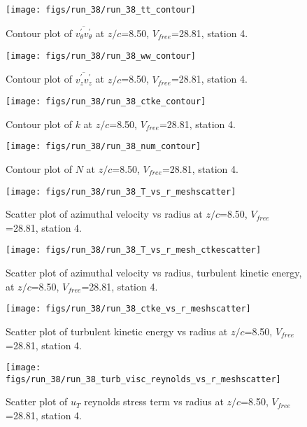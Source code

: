\begin{figure}[H]
\centering
\texttt{[image: figs/run\_38/run\_38\_tt\_contour]}
\caption{Contour plot of $\overline{v_{\theta}^{\prime} v_{\theta}^{\prime}}$ at $z/c$=8.50, $V_{free}$=28.81, station 4.}
\end{figure}


\begin{figure}[H]
\centering
\texttt{[image: figs/run\_38/run\_38\_ww\_contour]}
\caption{Contour plot of $\overline{v_{z}^{\prime} v_{z}^{\prime}}$ at $z/c$=8.50, $V_{free}$=28.81, station 4.}
\end{figure}


\begin{figure}[H]
\centering
\texttt{[image: figs/run\_38/run\_38\_ctke\_contour]}
\caption{Contour plot of $k$ at $z/c$=8.50, $V_{free}$=28.81, station 4.}
\end{figure}


\begin{figure}[H]
\centering
\texttt{[image: figs/run\_38/run\_38\_num\_contour]}
\caption{Contour plot of $N$ at $z/c$=8.50, $V_{free}$=28.81, station 4.}
\end{figure}


\begin{figure}[H]
\centering
\texttt{[image: figs/run\_38/run\_38\_T\_vs\_r\_meshscatter]}
\caption{Scatter plot of azimuthal velocity vs radius at $z/c$=8.50, $V_{free}$=28.81, station 4.}
\end{figure}


\begin{figure}[H]
\centering
\texttt{[image: figs/run\_38/run\_38\_T\_vs\_r\_mesh\_ctkescatter]}
\caption{Scatter plot of azimuthal velocity vs radius, turbulent kinetic energy, at $z/c$=8.50, $V_{free}$=28.81, station 4.}
\end{figure}


\begin{figure}[H]
\centering
\texttt{[image: figs/run\_38/run\_38\_ctke\_vs\_r\_meshscatter]}
\caption{Scatter plot of turbulent kinetic energy vs radius at $z/c$=8.50, $V_{free}$=28.81, station 4.}
\end{figure}


\begin{figure}[H]
\centering
\texttt{[image: figs/run\_38/run\_38\_turb\_visc\_reynolds\_vs\_r\_meshscatter]}
\caption{Scatter plot of $
u_T$ reynolds stress term vs radius at $z/c$=8.50, $V_{free}$=28.81, station 4.}
\end{figure}


